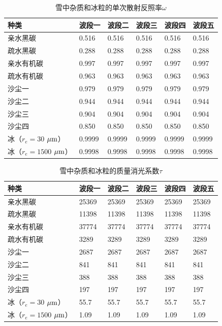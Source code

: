 \begin{table}[htbp]
\centering
\caption{雪中杂质和冰粒的单次散射反照率$\omega$}
\label{tab:积雪单次散射反照率}
\begin{tabular}{llllll}
\toprule
种类 & 波段一 & 波段二 & 波段三 & 波段四 & 波段五 \\ \midrule
亲水黑碳 & 0.516 & 0.516 & 0.516 & 0.516 & 0.516 \\
疏水黑碳 & 0.288 & 0.288 & 0.288 & 0.288 & 0.288 \\
亲水有机碳 & 0.997 & 0.997 & 0.997 & 0.997 & 0.997 \\
疏水有机碳 & 0.963 & 0.963 & 0.963 & 0.963 & 0.963 \\
沙尘一 & 0.979 & 0.979 & 0.979 & 0.979 & 0.979 \\
沙尘二 & 0.944 & 0.944 & 0.944 & 0.944 & 0.944 \\
沙尘三 & 0.904 & 0.904 & 0.904 & 0.904 & 0.904 \\
沙尘四 & 0.850 & 0.850 & 0.850 & 0.850 & 0.850 \\
冰（$r_{e}=30$ $\mu\rm{m}$） & 0.9999 & 0.9999 & 0.9999 & 0.9999 &
0.9999 \\
冰（$r_{e}=1500$ $\mu\rm{m}$） & 0.9998 & 0.9998 & 0.9998 & 0.9998 &
0.9998 \\ \bottomrule
\end{tabular}
\end{table}

\begin{table}[htbp]
\centering
\caption{雪中杂质和冰粒的质量消光系数$\tau$}
\label{tab:积雪消光系数}
\begin{tabular}{llllll}
\toprule
种类 & 波段一 & 波段二 & 波段三 & 波段四 & 波段五 \\ \midrule
亲水黑碳 & 25369 & 25369 & 25369 & 25369 & 25369 \\
疏水黑碳 & 11398 & 11398 & 11398 & 11398 & 11398 \\
亲水有机碳 & 37774 & 37774 & 37774 & 37774 & 37774 \\
疏水有机碳 & 3289 & 3289 & 3289 & 3289 & 3289 \\
沙尘一 & 2687 & 2687 & 2687 & 2687 & 2687 \\
沙尘二 & 841 & 841 & 841 & 841 & 841 \\
沙尘三 & 388 & 388 & 388 & 388 & 388 \\
沙尘四 & 197 & 197 & 197 & 197 & 197 \\
冰（$r_{e}=30$ $\mu\rm{m}$） & 55.7 & 55.7 & 55.7 & 55.7 & 55.7 \\
冰（$r_{e}=1500$ $\mu\rm{m}$） & 1.09 & 1.09 & 1.09 & 1.09 & 1.09 \\ \bottomrule
\end{tabular}
\end{table}

